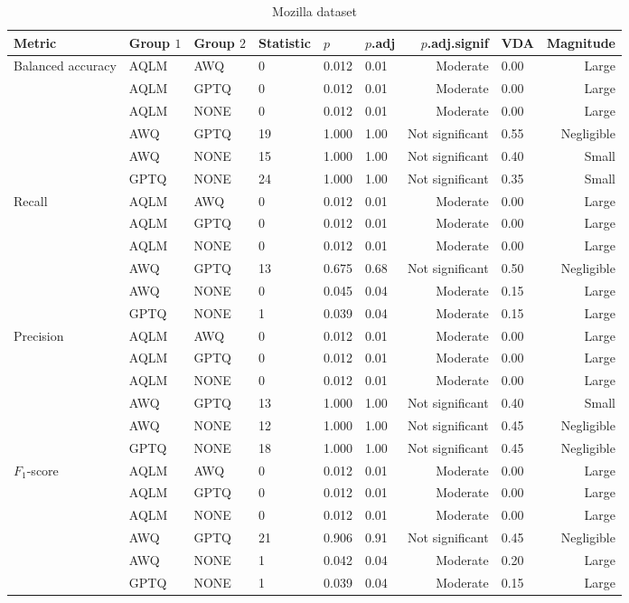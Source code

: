 \begin{table}[h]
\centering
\caption*{Mozilla dataset}
\begin{tabular}{llllllrlr}
\toprule
Metric & Group $1$ & Group $2$ & Statistic & $p$ & $p$.adj & $p$.adj.signif & VDA & Magnitude\\
\midrule
Balanced accuracy & AQLM & AWQ & 0 & 0.012 & 0.01 & Moderate & 0.00 & Large \\
\phantom & AQLM & GPTQ & 0 & 0.012 & 0.01 & Moderate & 0.00 & Large \\
\phantom & AQLM & NONE & 0 & 0.012 & 0.01 & Moderate & 0.00 & Large \\
\phantom & AWQ & GPTQ & 19 & 1.000 & 1.00 & Not significant & 0.55 & Negligible \\
\phantom & AWQ & NONE & 15 & 1.000 & 1.00 & Not significant & 0.40 & Small \\
\phantom & GPTQ & NONE & 24 & 1.000 & 1.00 & Not significant & 0.35 & Small \\
\midrule
Recall & AQLM & AWQ & 0 & 0.012 & 0.01 & Moderate & 0.00 & Large \\
\phantom & AQLM & GPTQ & 0 & 0.012 & 0.01 & Moderate & 0.00 & Large \\
\phantom & AQLM & NONE & 0 & 0.012 & 0.01 & Moderate & 0.00 & Large \\
\phantom & AWQ & GPTQ & 13 & 0.675 & 0.68 & Not significant & 0.50 & Negligible \\
\phantom & AWQ & NONE & 0 & 0.045 & 0.04 & Moderate & 0.15 & Large \\
\phantom & GPTQ & NONE & 1 & 0.039 & 0.04 & Moderate & 0.15 & Large \\
\midrule
Precision & AQLM & AWQ & 0 & 0.012 & 0.01 & Moderate & 0.00 & Large \\
\phantom & AQLM & GPTQ & 0 & 0.012 & 0.01 & Moderate & 0.00 & Large \\
\phantom & AQLM & NONE & 0 & 0.012 & 0.01 & Moderate & 0.00 & Large \\
\phantom & AWQ & GPTQ & 13 & 1.000 & 1.00 & Not significant & 0.40 & Small \\
\phantom & AWQ & NONE & 12 & 1.000 & 1.00 & Not significant & 0.45 & Negligible \\
\phantom & GPTQ & NONE & 18 & 1.000 & 1.00 & Not significant & 0.45 & Negligible \\
\midrule
$F_1$-score & AQLM & AWQ & 0 & 0.012 & 0.01 & Moderate & 0.00 & Large \\
\phantom & AQLM & GPTQ & 0 & 0.012 & 0.01 & Moderate & 0.00 & Large \\
\phantom & AQLM & NONE & 0 & 0.012 & 0.01 & Moderate & 0.00 & Large \\
\phantom & AWQ & GPTQ & 21 & 0.906 & 0.91 & Not significant & 0.45 & Negligible \\
\phantom & AWQ & NONE & 1 & 0.042 & 0.04 & Moderate & 0.20 & Large \\
\phantom & GPTQ & NONE & 1 & 0.039 & 0.04 & Moderate & 0.15 & Large \\\end{tabular}
\label{tab:RQ1_posthoc_full}
\end{table}
